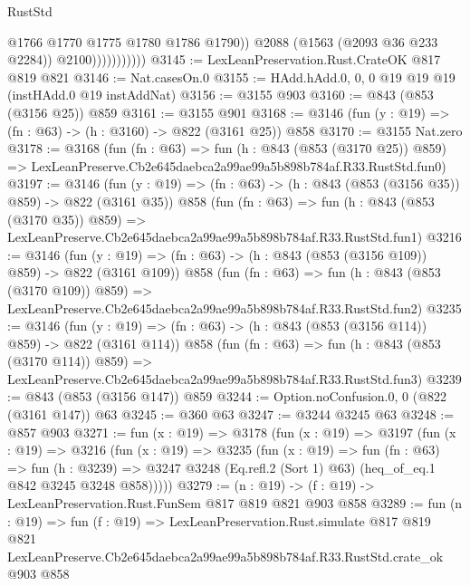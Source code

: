 \begin{lexlean}{RustStd}
\begin{coremodule}
                              @1766
                              @1770
                              @1775
                              @1780
                              @1786
                              @1790))
                          @2088
                          (@1563 (@2093 @36 @233 @2284))
                          @2100)))))))))))
@3145 := LexLeanPreservation.Rust.CrateOK @817 @819 @821
@3146 := Nat.casesOn.{0}
@3155 := HAdd.hAdd.{0, 0, 0} @19 @19 @19 (instHAdd.{0} @19 instAddNat)
@3156 := @3155 @903
@3160 := @843 (@853 (@3156 @25)) @859
@3161 := @3155 @901
@3168 := @3146 (fun (y : @19) => (fn : @63) -> (h : @3160) -> @822 (@3161 @25)) @858
@3170 := @3155 Nat.zero
@3178 := @3168
    (fun (fn : @63) =>
    fun (h : @843 (@853 (@3170 @25)) @859) =>
    LexLeanPreserve.Cb2e645daebca2a99ae99a5b898b784af.R33.RustStd.fun0)
@3197 := @3146
    (fun (y : @19) => (fn : @63) -> (h : @843 (@853 (@3156 @35)) @859) -> @822 (@3161 @35))
    @858
    (fun (fn : @63) =>
    fun (h : @843 (@853 (@3170 @35)) @859) =>
    LexLeanPreserve.Cb2e645daebca2a99ae99a5b898b784af.R33.RustStd.fun1)
@3216 := @3146
    (fun (y : @19) => (fn : @63) -> (h : @843 (@853 (@3156 @109)) @859) -> @822 (@3161 @109))
    @858
    (fun (fn : @63) =>
    fun (h : @843 (@853 (@3170 @109)) @859) =>
    LexLeanPreserve.Cb2e645daebca2a99ae99a5b898b784af.R33.RustStd.fun2)
@3235 := @3146
    (fun (y : @19) => (fn : @63) -> (h : @843 (@853 (@3156 @114)) @859) -> @822 (@3161 @114))
    @858
    (fun (fn : @63) =>
    fun (h : @843 (@853 (@3170 @114)) @859) =>
    LexLeanPreserve.Cb2e645daebca2a99ae99a5b898b784af.R33.RustStd.fun3)
@3239 := @843 (@853 (@3156 @147)) @859
@3244 := Option.noConfusion.{0, 0} (@822 (@3161 @147)) @63
@3245 := @360 @63
@3247 := @3244 @3245 @63
@3248 := @857 @903
@3271 := fun (x : @19) =>
  @3178
    (fun (x : @19) =>
    @3197
      (fun (x : @19) =>
      @3216
        (fun (x : @19) =>
        @3235
          (fun (x : @19) =>
          fun (fn : @63) =>
          fun (h : @3239) =>
          @3247 @3248 (Eq.refl.{2} (Sort 1) @63) (heq_of_eq.{1} @842 @3245 @3248 @858)))))
@3279 := (n : @19) -> (f : @19) -> LexLeanPreservation.Rust.FunSem @817 @819 @821 @903 @858
@3289 := fun (n : @19) =>
  fun (f : @19) =>
  LexLeanPreservation.Rust.simulate
    @817
    @819
    @821
    LexLeanPreserve.Cb2e645daebca2a99ae99a5b898b784af.R33.RustStd.crate_ok
    @903
    @858
\end{coremodule}
\end{lexlean}
